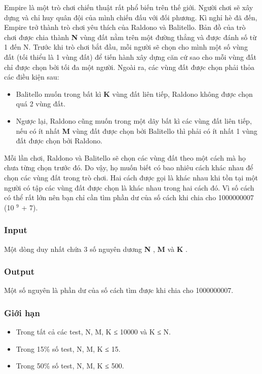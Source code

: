 



   Empire là một trò chơi chiến thuật rất phổ biến trên thế giới. Người chơi sẽ xây dựng và chỉ huy quân đội của mình chiến đấu với đối phương. Kì nghỉ hè đã đến, Empire trở thành trò chơi yêu thích của Raldono và Balitello. Bản đồ của trò chơi được chia thành   \textbf{    N   }   vùng đất nằm trên một đường thẳng và được đánh số từ 1 đến N. Trước khi trò chơi bắt đầu, mỗi người sẽ chọn cho mình một số vùng đất (tối thiểu là 1 vùng đất) để tiến hành xây dựng căn cứ sao cho mỗi vùng đất chỉ được chọn bởi tối đa một người. Ngoài ra, các vùng đất được chọn phải thỏa các điều kiện sau:  
\begin{itemize}
	\item     Balitello muốn trong bất kì    \textbf{     K    }    vùng đất liên tiếp, Raldono không được chọn quá 2 vùng đất.   
	\item     Ngược lại, Raldono cũng muốn trong một dãy bất kì các vùng đất liên tiếp, nếu có ít nhất    \textbf{     M    }    vùng đất được chọn bởi Balitello thì phải có ít nhất 1 vùng đất được chọn bởi Raldono.   
\end{itemize}

   Mỗi lần chơi, Raldono và Balitello sẽ chọn các vùng đất theo một cách mà họ chưa từng chọn trước đó. Do vậy, họ muốn biết có bao nhiêu cách khác nhau để chọn các vùng đất trong trò chơi. Hai cách được gọi là khác nhau khi tồn tại một người có tập các vùng đất được chọn là khác nhau trong hai cách đó. Vì số cách có thể rất lớn nên bạn chỉ cần tìm phần dư của số cách khi chia cho 1000000007 (10   $^    9   $   + 7).  

\subsubsection{   Input  }

   Một dòng duy nhất chứa 3 số nguyên dương   \textbf{    N   }   ,   \textbf{    M   }   và   \textbf{    K   }   .  

\subsubsection{   Output  }

   Một số nguyên là phần dư của số cách tìm được khi chia cho 1000000007.  

\subsubsection{   Giới hạn  }
\begin{itemize}
	\item     Trong tất cả các test, N, M, K ≤ 10000 và K ≤ N.   
	\item     Trong 15\% số test, N, M, K ≤ 15.   
	\item     Trong 50\% số test, N, M, K ≤ 500.   
\end{itemize}

